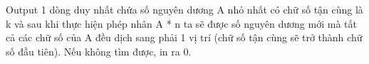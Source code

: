 Output
1 dòng duy nhất chứa số nguyên dương A nhỏ nhất có chữ số tận cùng là k và sau khi thực hiện phép nhân A * n ta sẽ được số nguyên dương mới mà tất cả các chữ số của A đều dịch sang phải 1 vị trí (chữ số tận cùng sẽ trở thành chữ số đầu tiên). Nếu không tìm được, in ra 0.